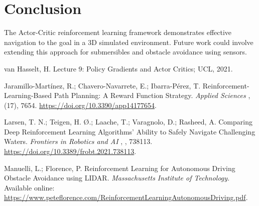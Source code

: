 \documentclass[12pt]{article}
\begin{document}
\section{Conclusion}
The Actor-Critic reinforcement learning framework demonstrates effective navigation to the goal in a 3D simulated environment. Future work could involve extending this approach for submersibles and obstacle avoidance using sensors.

\begin{thebibliography}{}
\raggedright

van Hasselt, H. Lecture 9: Policy Gradients and Actor Critics; UCL, 2021. 

Jaramillo-Martínez, R.; Chavero-Navarrete, E.; Ibarra-Pérez, T. Reinforcement-Learning-Based Path Planning: A Reward Function Strategy. \textit{Applied Sciences} ,  (17), 7654. \url{https://doi.org/10.3390/app14177654}.

Larsen, T. N.; Teigen, H. Ø.; Laache, T.; Varagnolo, D.; Rasheed, A. Comparing Deep Reinforcement Learning Algorithms’ Ability to Safely Navigate Challenging Waters. \textit{Frontiers in Robotics and AI} , , 738113. \url{https://doi.org/10.3389/frobt.2021.738113}.

Manuelli, L.; Florence, P. Reinforcement Learning for Autonomous Driving Obstacle Avoidance using LIDAR. \textit{Massachusetts Institute of Technology.} Available online: \url{https://www.peteflorence.com/ReinforcementLearningAutonomousDriving.pdf}.

\end{thebibliography}
\end{document}
